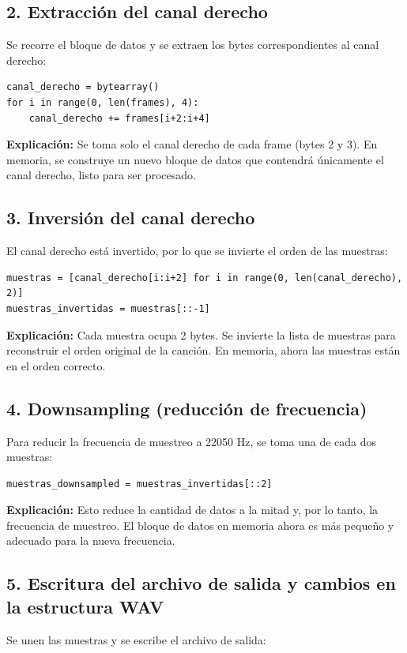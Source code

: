 \documentclass[12pt]{article}
\begin{document}
\subsection*{2. Extracción del canal derecho}
Se recorre el bloque de datos y se extraen los bytes correspondientes al canal derecho:

\begin{verbatim}
canal_derecho = bytearray()
for i in range(0, len(frames), 4):
    canal_derecho += frames[i+2:i+4]
\end{verbatim}

\textbf{Explicación:} Se toma solo el canal derecho de cada frame (bytes 2 y 3). En memoria, se construye un nuevo bloque de datos que contendrá únicamente el canal derecho, listo para ser procesado.

\subsection*{3. Inversión del canal derecho}
El canal derecho está invertido, por lo que se invierte el orden de las muestras:

\begin{verbatim}
muestras = [canal_derecho[i:i+2] for i in range(0, len(canal_derecho), 2)]
muestras_invertidas = muestras[::-1]
\end{verbatim}

\textbf{Explicación:} Cada muestra ocupa 2 bytes. Se invierte la lista de muestras para reconstruir el orden original de la canción. En memoria, ahora las muestras están en el orden correcto.

\subsection*{4. Downsampling (reducción de frecuencia)}
Para reducir la frecuencia de muestreo a 22050 Hz, se toma una de cada dos muestras:

\begin{verbatim}
muestras_downsampled = muestras_invertidas[::2]
\end{verbatim}

\textbf{Explicación:} Esto reduce la cantidad de datos a la mitad y, por lo tanto, la frecuencia de muestreo. El bloque de datos en memoria ahora es más pequeño y adecuado para la nueva frecuencia.

\subsection*{5. Escritura del archivo de salida y cambios en la estructura WAV}
Se unen las muestras y se escribe el archivo de salida:
\end{document}
